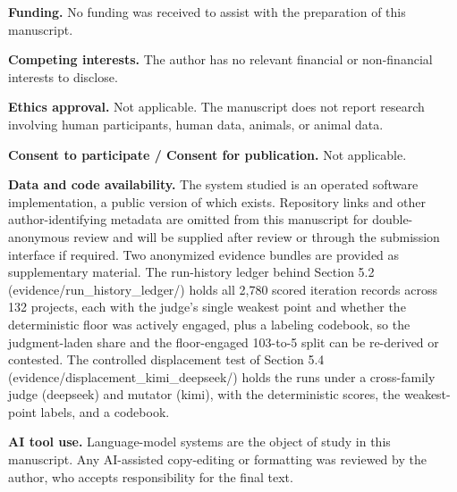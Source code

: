 \documentclass[11pt]{article}
\begin{document}
\textbf{Funding.} No funding was received to assist with the preparation of this manuscript.

\textbf{Competing interests.} The author has no relevant financial or non-financial interests to disclose.

\textbf{Ethics approval.} Not applicable. The manuscript does not report research involving human participants, human data, animals, or animal data.

\textbf{Consent to participate / Consent for publication.} Not applicable.

\textbf{Data and code availability.} The system studied is an operated software implementation, a public version of which exists. Repository links and other author-identifying metadata are omitted from this manuscript for double-anonymous review and will be supplied after review or through the submission interface if required. Two anonymized evidence bundles are provided as supplementary material. The run-history ledger behind Section 5.2 (evidence/run\_history\_ledger/) holds all 2{,}780 scored iteration records across 132 projects, each with the judge's single weakest point and whether the deterministic floor was actively engaged, plus a labeling codebook, so the judgment-laden share and the floor-engaged 103-to-5 split can be re-derived or contested. The controlled displacement test of Section 5.4 (evidence/displacement\_kimi\_deepseek/) holds the runs under a cross-family judge (deepseek) and mutator (kimi), with the deterministic scores, the weakest-point labels, and a codebook.

\textbf{AI tool use.} Language-model systems are the object of study in this manuscript. Any AI-assisted copy-editing or formatting was reviewed by the author, who accepts responsibility for the final text.


\end{document}

